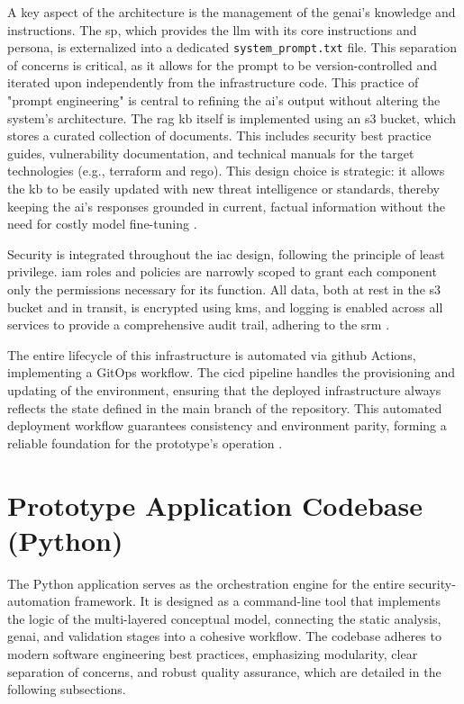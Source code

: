 A key aspect of the architecture is the management of the \gls{genai}'s knowledge and instructions. The \gls{sp}, which provides the \gls{llm} with its core instructions and persona, is externalized into a dedicated \texttt{system\_prompt.txt} file. This separation of concerns is critical, as it allows for the prompt to be version-controlled and iterated upon independently from the infrastructure code. This practice of "prompt engineering" is central to refining the \gls{ai}'s output without altering the system's architecture. The \gls{rag} \gls{kb} itself is implemented using an \gls{s3} bucket, which stores a curated collection of documents. This includes security best practice guides, vulnerability documentation, and technical manuals for the target technologies (e.g., \gls{terraform} and \gls{rego}). This design choice is strategic: it allows the \gls{kb} to be easily updated with new threat intelligence or standards, thereby keeping the \gls{ai}'s responses grounded in current, factual information without the need for costly model fine-tuning \cite{lewis_retrieval-augmented_2021}.

Security is integrated throughout the \gls{iac} design, following the principle of least privilege. \gls{iam} roles and policies are narrowly scoped to grant each component only the permissions necessary for its function. All data, both at rest in the \gls{s3} bucket and in transit, is encrypted using \gls{kms}, and logging is enabled across all services to provide a comprehensive audit trail, adhering to the \gls{srm} \cite{noauthor_aws_nodate}.

The entire lifecycle of this infrastructure is automated via \gls{github} Actions, implementing a GitOps workflow. The \gls{cicd} pipeline handles the provisioning and updating of the environment, ensuring that the deployed infrastructure always reflects the state defined in the main branch of the repository. This automated deployment workflow guarantees consistency and environment parity, forming a reliable foundation for the prototype's operation \cite{noauthor_gitops_nodate}.

\section{Prototype Application Codebase (Python)}

The Python application serves as the \gls{orchestration} engine for the entire \gls{security-automation} framework. It is designed as a command-line tool that implements the logic of the multi-layered conceptual model, connecting the static analysis, \gls{genai}, and validation stages into a cohesive workflow. The codebase adheres to modern software engineering best practices, emphasizing modularity, clear separation of concerns, and robust quality assurance, which are detailed in the following subsections.

